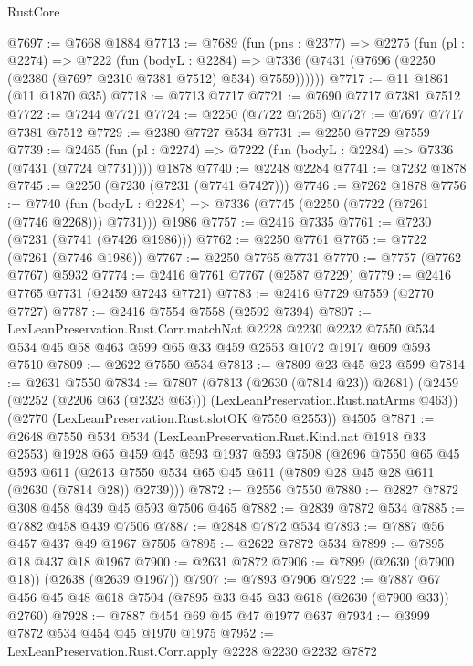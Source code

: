 \begin{lexlean}{RustCore}
\begin{coremodule}
@7697 := @7668 @1884
@7713 := @7689
    (fun (pns : @2377) =>
    @2275
      (fun (pl : @2274) =>
      @7222
        (fun (bodyL : @2284) =>
        @7336 (@7431 (@7696 (@2250 (@2380 (@7697 @2310 @7381 @7512) @534) @7559))))))
@7717 := @11 @1861 (@11 @1870 @35)
@7718 := @7713 @7717
@7721 := @7690 @7717 @7381 @7512
@7722 := @7244 @7721
@7724 := @2250 (@7722 @7265)
@7727 := @7697 @7717 @7381 @7512
@7729 := @2380 @7727 @534
@7731 := @2250 @7729 @7559
@7739 := @2465
    (fun (pl : @2274) => @7222 (fun (bodyL : @2284) => @7336 (@7431 (@7724 @7731))))
    @1878
@7740 := @2248 @2284
@7741 := @7232 @1878
@7745 := @2250 (@7230 (@7231 (@7741 @7427)))
@7746 := @7262 @1878
@7756 := @7740
    (fun (bodyL : @2284) => @7336 (@7745 (@2250 (@7722 (@7261 (@7746 @2268))) @7731)))
    @1986
@7757 := @2416 @7335
@7761 := @7230 (@7231 (@7741 (@7426 @1986)))
@7762 := @2250 @7761
@7765 := @7722 (@7261 (@7746 @1986))
@7767 := @2250 @7765 @7731
@7770 := @7757 (@7762 @7767) @5932
@7774 := @2416 @7761 @7767 (@2587 @7229)
@7779 := @2416 @7765 @7731 (@2459 @7243 @7721)
@7783 := @2416 @7729 @7559 (@2770 @7727)
@7787 := @2416 @7554 @7558 (@2592 @7394)
@7807 := LexLeanPreservation.Rust.Corr.matchNat
    @2228
    @2230
    @2232
    @7550
    @534
    @534
    @45
    @58
    @463
    @599
    @65
    @33
    @459
    @2553
    @1072
    @1917
    @609
    @593
    @7510
@7809 := @2622 @7550 @534
@7813 := @7809 @23 @45 @23 @599
@7814 := @2631 @7550
@7834 := @7807
    (@7813 (@2630 (@7814 @23)) @2681)
    (@2459 (@2252 (@2206 @63 (@2323 @63))) (LexLeanPreservation.Rust.natArms @463))
    (@2770 (LexLeanPreservation.Rust.slotOK @7550 @2553))
    @4505
@7871 := @2648
    @7550
    @534
    @534
    (LexLeanPreservation.Rust.Kind.nat @1918 @33 @2553)
    @1928
    @65
    @459
    @45
    @593
    @1937
    @593
    @7508
    (@2696
      @7550
      @65
      @45
      @593
      @611
      (@2613 @7550 @534 @65 @45 @611 (@7809 @28 @45 @28 @611 (@2630 (@7814 @28)) @2739)))
@7872 := @2556 @7550
@7880 := @2827 @7872 @308 @458 @439 @45 @593 @7506 @465
@7882 := @2839 @7872 @534
@7885 := @7882 @458 @439 @7506
@7887 := @2848 @7872 @534
@7893 := @7887 @56 @457 @437 @49 @1967 @7505
@7895 := @2622 @7872 @534
@7899 := @7895 @18 @437 @18 @1967
@7900 := @2631 @7872
@7906 := @7899 (@2630 (@7900 @18)) (@2638 (@2639 @1967))
@7907 := @7893 @7906
@7922 := @7887 @67 @456 @45 @48 @618 @7504 (@7895 @33 @45 @33 @618 (@2630 (@7900 @33)) @2760)
@7928 := @7887 @454 @69 @45 @47 @1977 @637
@7934 := @3999 @7872 @534 @454 @45 @1970 @1975
@7952 := LexLeanPreservation.Rust.Corr.apply
    @2228
    @2230
    @2232
    @7872

\end{coremodule}
\end{lexlean}

